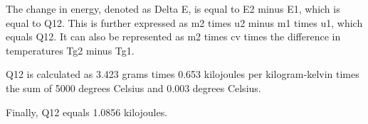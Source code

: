 The change in energy, denoted as Delta E, is equal to E2 minus E1, which is equal to Q12. This is further expressed as m2 times u2 minus m1 times u1, which equals Q12. It can also be represented as m2 times cv times the difference in temperatures Tg2 minus Tg1.

Q12 is calculated as 3.423 grams times 0.653 kilojoules per kilogram-kelvin times the sum of 5000 degrees Celsius and 0.003 degrees Celsius.

Finally, Q12 equals 1.0856 kilojoules.